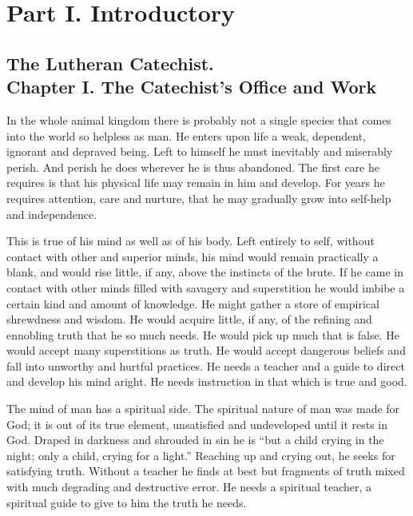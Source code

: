 \part{Part I. Introductory}

\chapter[Chapter I. The Catechist’s Office and Work]{The Lutheran Catechist.\\Chapter I. The Catechist’s Office and Work}

In the whole animal kingdom there is probably not a single species that comes into the world so helpless as man. He enters upon life a weak, dependent, ignorant and depraved being. Left to himself he must inevitably and miserably perish. And perish he does wherever he is thus abandoned. The first care he requires is that his physical life may remain in him and develop. For years he requires attention, care and nurture, that he may gradually grow into self-help and independence.

This is true of his mind as well as of his body. Left entirely to self, without contact with other and superior minds, his mind would remain practically a blank, and would rise little, if any, above the instincts of the brute. If he came in contact with other minds filled with savagery and superstition he would imbibe a certain kind and amount of knowledge. He might gather a store of empirical shrewdness and wisdom. He would acquire little, if any, of
the refining and ennobling truth that he so much needs. He would pick up much that is false. He would accept many superstitions as truth. He would accept dangerous beliefs and fall into unworthy and hurtful practices. He needs a teacher and a guide to direct and develop his mind aright. He needs instruction in that which is true and good.

The mind of man has a spiritual side. The spiritual nature of man was made for God; it is out of its true element, unsatisfied and undeveloped until it rests in God. Draped in darkness and shrouded in sin he is “but a child crying in the night; only a child, crying for a light.” Reaching up and crying out, he seeks for satisfying truth. Without a teacher he finds at best but fragments of truth mixed with much degrading and destructive error. He needs a spiritual teacher, a spiritual guide to give to him the truth he needs.

